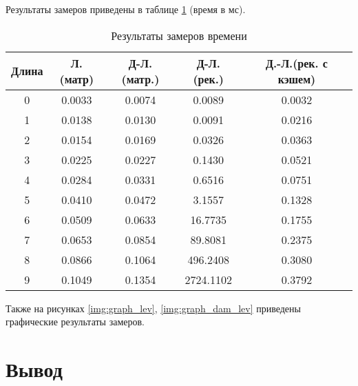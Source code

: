 Результаты замеров приведены в таблице \ref{tbl:time_mes} (время в мс).

\begin{table}[h]
    \begin{center}
        \begin{threeparttable}
        \captionsetup{justification=raggedright,singlelinecheck=off}
        \caption{Результаты замеров времени}
        \label{tbl:time_mes}
        \begin{tabular}{|c|c|c|c|c|}
            \hline
            Длина & Л.(матр) & Д-Л.(матр.)& Д-Л.(рек.) & Д.-Л.(рек. с кэшем)  \\
            \hline
            0 & 0.0033 & 0.0074 & 0.0089 & 0.0032 \\
            \hline
            1 & 0.0138 & 0.0130 & 0.0091 & 0.0216 \\ 
            \hline
            2 & 0.0154 & 0.0169 & 0.0326 & 0.0363 \\ 
            \hline
            3 & 0.0225 & 0.0227 & 0.1430 & 0.0521 \\ 
            \hline
            4 & 0.0284 & 0.0331 & 0.6516 & 0.0751 \\ 
            \hline
            5 & 0.0410 & 0.0472 & 3.1557 & 0.1328 \\ 
            \hline
            6 & 0.0509 & 0.0633 & 16.7735 & 0.1755 \\ 
            \hline
            7 & 0.0653 & 0.0854 & 89.8081 & 0.2375 \\ 
            \hline
            8 & 0.0866 & 0.1064 & 496.2408 & 0.3080 \\ 
            \hline
            9 & 0.1049 & 0.1354 & 2724.1102 & 0.3792 \\ 
            \hline
		\end{tabular}
    \end{threeparttable}
\end{center}
\end{table}

Также на рисунках \ref{img:graph_lev}, \ref{img:graph_dam_lev} приведены графические результаты замеров.

\clearpage


\section{Вывод}

